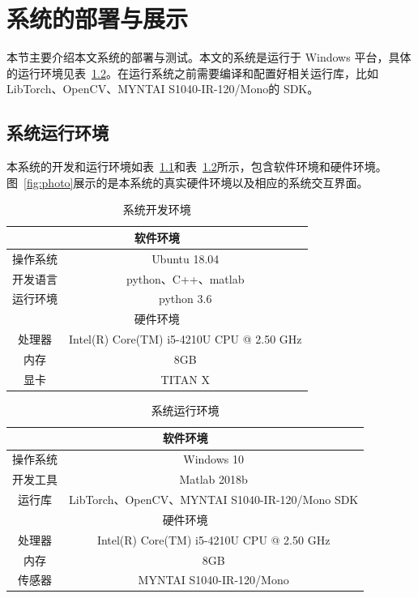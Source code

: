 
\chapter{系统的部署与展示}\label{figures_tables}
本节主要介绍本文系统的部署与测试。本文的系统是运行于 Windows 平台，具体的运行环境见表~\ref{tab:env2}。在运行系统之前需要编译和配置好相关运行库，比如 LibTorch、OpenCV、MYNTAI S1040-IR-120/Mono的 SDK。

\section{系统运行环境}
本系统的开发和运行环境如表~\ref{tab:env1}和表~\ref{tab:env2}所示，包含软件环境和硬件环境。图~\ref{fig:photo}展示的是本系统的真实硬件环境以及相应的系统交互界面。
\begin{table}[thbp]
	\centering
	\small{}\setlength{}
	\caption{系统开发环境}
	\begin{tabular}{|c|c|}
		\hline
		\multicolumn{2}{|c|}{软件环境}                \\
		\hline
		操作系统   & Ubuntu 18.04 \\
		\hline
		开发语言   & python、C++、matlab \\
		\hline
		运行环境  & python 3.6    \\
		\hline
		\multicolumn{2}{|c|}{硬件环境} \\
		\hline
		处理器    &      Intel(R) Core(TM) i5-4210U CPU @ 2.50 GHz  \\
		\hline
		内存      &       8GB         \\
		\hline
		显卡    &     TITAN X       \\
		\hline
	\end{tabular}
	\label{tab:env1}
\end{table}

\begin{table}[thbp]
  \centering
  \small{}\setlength{}
  \caption{系统运行环境}
  \begin{tabular}{|c|c|}
    \hline
    \multicolumn{2}{|c|}{软件环境}                \\
    \hline
    操作系统   & Windows 10 					  \\
    \hline
    开发工具  & Matlab 2018b  					   \\
    \hline
    运行库   & LibTorch、OpenCV、MYNTAI S1040-IR-120/Mono SDK \\
    \hline
    \multicolumn{2}{|c|}{硬件环境} \\
    \hline
    处理器    &      Intel(R) Core(TM) i5-4210U CPU @ 2.50 GHz  \\
    \hline
    内存      &       8GB         \\
    \hline
    传感器    &     MYNTAI S1040-IR-120/Mono          \\
    \hline
  \end{tabular}
  \label{tab:env2}
\end{table}

